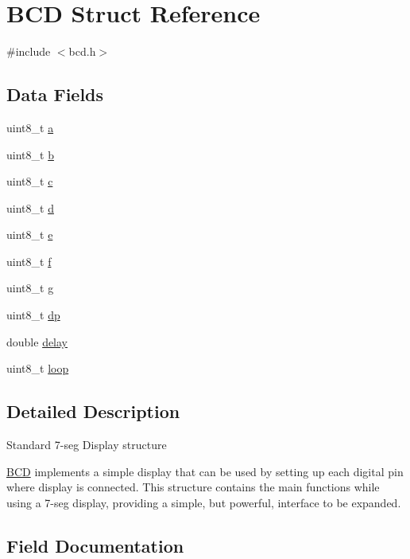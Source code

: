 \hypertarget{structBCD}{}\section{B\+CD Struct Reference}
\label{structBCD}


{\ttfamily \#include $<$bcd.\+h$>$}

\subsection*{Data Fields}
\begin{DoxyCompactItemize}
\item 
uint8\+\_\+t \mbox{\hyperlink{structBCD_a47f4ac66f533a80b7ad832c36189eef9}{a}}
\item 
uint8\+\_\+t \mbox{\hyperlink{structBCD_ad0a5d9e51ea7e8cc105a6d02cec8b60b}{b}}
\item 
uint8\+\_\+t \mbox{\hyperlink{structBCD_a888d1510f4c5b6cf0957d3794cdf1941}{c}}
\item 
uint8\+\_\+t \mbox{\hyperlink{structBCD_ac2e48667814cb2c29e02019592e7368f}{d}}
\item 
uint8\+\_\+t \mbox{\hyperlink{structBCD_ac48c12d16a3111700c6a67f46db7ea1f}{e}}
\item 
uint8\+\_\+t \mbox{\hyperlink{structBCD_abd6ad9ecd210b3f8d15a269526534a10}{f}}
\item 
uint8\+\_\+t \mbox{\hyperlink{structBCD_a84dac73393cccf960f31340c034aee2e}{g}}
\item 
uint8\+\_\+t \mbox{\hyperlink{structBCD_a2a88e8f3a8147a01b12e3393b4b034c2}{dp}}
\item 
double \mbox{\hyperlink{structBCD_a4575c9325254534125fadd7d32061f57}{delay}}
\item 
uint8\+\_\+t \mbox{\hyperlink{structBCD_a6daf4f1f982e97a20852eedd79f4d619}{loop}}
\end{DoxyCompactItemize}


\subsection{Detailed Description}
Standard 7-\/seg Display structure

\mbox{\hyperlink{structBCD}{B\+CD}} implements a simple display that can be used by setting up each digital pin where display is connected. This structure contains the main functions while using a 7-\/seg display, providing a simple, but powerful, interface to be expanded. 

\subsection{Field Documentation}
\mbox{\label{structBCD_a47f4ac66f533a80b7ad832c36189eef9}} 
